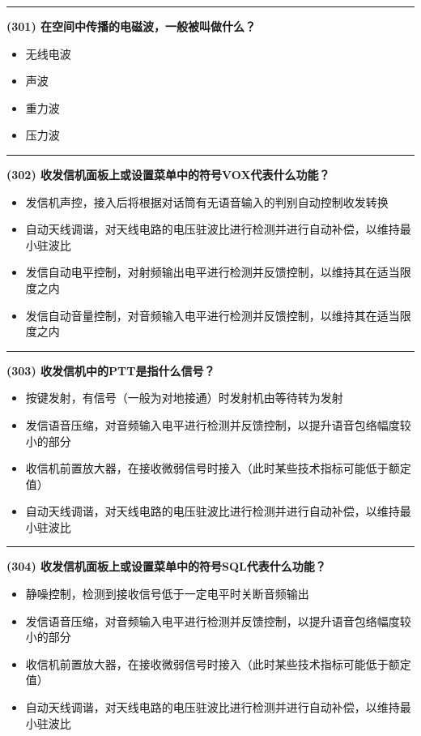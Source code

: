 \documentclass[twocolumn]{ctexart}  %
\begin{document}
\noindent\rule{0.5\textwidth}{1pt}
\heiti \textbf{(301) 在空间中传播的电磁波，一般被叫做什么？} \songti {\color{gray} [LK1144] }
\begin{itemize}
	\item  无线电波
	\item  声波
	\item  重力波
	\item  压力波
\end{itemize}


\noindent\rule{0.5\textwidth}{1pt}
\heiti \textbf{(302) 收发信机面板上或设置菜单中的符号VOX代表什么功能？} \songti {\color{gray} [LK0255] }
\begin{itemize}
	\item  发信机声控，接入后将根据对话筒有无语音输入的判别自动控制收发转换
	\item  自动天线调谐，对天线电路的电压驻波比进行检测并进行自动补偿，以维持最小驻波比
	\item  发信自动电平控制，对射频输出电平进行检测并反馈控制，以维持其在适当限度之内
	\item  发信自动音量控制，对音频输入电平进行检测并反馈控制，以维持其在适当限度之内
\end{itemize}


\noindent\rule{0.5\textwidth}{1pt}
\heiti \textbf{(303) 收发信机中的PTT是指什么信号？} \songti {\color{gray} [LK0258] }
\begin{itemize}
	\item  按键发射，有信号（一般为对地接通）时发射机由等待转为发射
	\item  发信语音压缩，对音频输入电平进行检测并反馈控制，以提升语音包络幅度较小的部分
	\item  收信机前置放大器，在接收微弱信号时接入（此时某些技术指标可能低于额定值）
	\item  自动天线调谐，对天线电路的电压驻波比进行检测并进行自动补偿，以维持最小驻波比
\end{itemize}


\noindent\rule{0.5\textwidth}{1pt}
\heiti \textbf{(304) 收发信机面板上或设置菜单中的符号SQL代表什么功能？} \songti {\color{gray} [LK0259] }
\begin{itemize}
	\item  静噪控制，检测到接收信号低于一定电平时关断音频输出
	\item  发信语音压缩，对音频输入电平进行检测并反馈控制，以提升语音包络幅度较小的部分
	\item  收信机前置放大器，在接收微弱信号时接入（此时某些技术指标可能低于额定值）
	\item  自动天线调谐，对天线电路的电压驻波比进行检测并进行自动补偿，以维持最小驻波比
\end{itemize}
\end{document}
